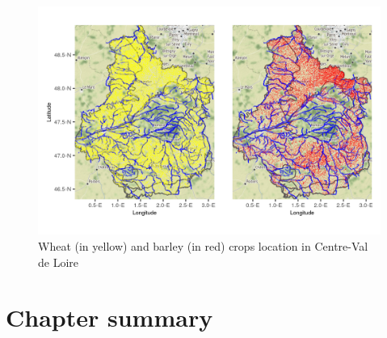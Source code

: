 \begin{figure}[htbp]
    \centering
    \includegraphics{figs/App/Occ_soil.png}
    \caption{Wheat (in yellow) and barley (in red) crops location in Centre-Val de Loire}
    \label{fig:crops}
\end{figure} 


\clearpage

\section{Chapter summary}

